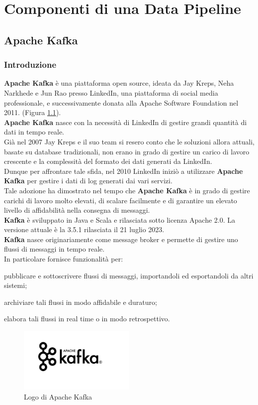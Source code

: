 \chapter{Componenti di una Data Pipeline}\label{cap:Componenti di una Data Pipeline}
\section{Apache Kafka}
\subsection{Introduzione}
\textbf{Apache Kafka} è una piattaforma \gls{open source}{}, ideata da Jay Kreps, Neha Narkhede e Jun Rao presso LinkedIn, una piattaforma di social media professionale,
 e successivamente donata alla \gls{Apache Software Foundation}{} nel 2011. (Figura \ref{fig:logo_kafka}).\\
\textbf{Apache Kafka} nasce con la necessità di LinkedIn di gestire grandi quantità di dati in tempo reale.\\ Già nel 2007 
Jay Kreps e il suo team si resero conto che le soluzioni allora attuali, basate su database tradizionali, non erano in grado di gestire 
un carico di lavoro crescente e la complessità del formato dei dati generati da LinkedIn.\\
Dunque per affrontare tale sfida, nel 2010 LinkedIn iniziò a utilizzare \textbf{Apache Kafka} per gestire i dati di \gls{log}{} generati dai vari servizi. \\
Tale adozione ha dimostrato nel tempo che \textbf{Apache Kafka} è in grado di gestire carichi di lavoro molto elevati, di scalare facilmente e di garantire un elevato livello di affidabilità nella consegna di messaggi.\\ 
\textbf{Kafka} è sviluppato in Java e Scala e rilasciata sotto licenza Apache 2.0. La versione attuale è la 3.5.1 rilasciata il 21 luglio 2023.\\
\textbf{Kafka} nasce originariamente come \gls{message broker}{} e permette di gestire uno flussi di messaggi in tempo reale. \\ 
In particolare fornisce funzionalità per:
\begin{list}{*}{}
    \item pubblicare e sottoscrivere flussi di messaggi, importandoli ed esportandoli da altri sistemi;
    \item archiviare tali flussi in modo affidabile e duraturo;
    \item elabora tali flussi in real time o in modo retrospettivo.
\end{list}
\begin{figure}[h]
    \centering
    \includegraphics[width=0.5\textwidth]{images/componenti/logo_kafka.png}
    \caption{Logo di Apache Kafka}
    \label{fig:logo_kafka}
\end{figure}
\pagebreak
